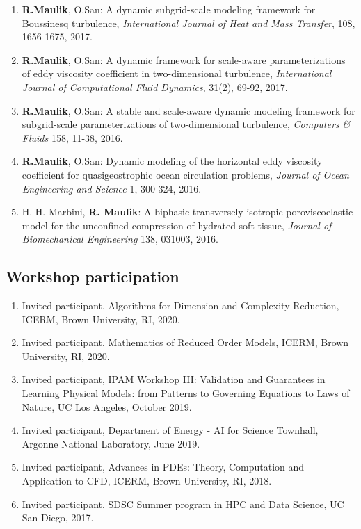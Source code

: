 \documentclass[letterpaper]{article}
\begin{document}
\begin{enumerate}
\item \textbf{R.Maulik}, O.San: A dynamic subgrid-scale modeling framework for Boussinesq turbulence, {\it International Journal of Heat and Mass Transfer}, 108, 1656-1675, 2017.

\item \textbf{R.Maulik}, O.San: A dynamic framework for scale-aware parameterizations of eddy viscosity coefficient in two-dimensional turbulence, {\it International Journal of Computational Fluid Dynamics}, 31(2), 69-92, 2017.

\item \textbf{R.Maulik}, O.San: A stable and scale-aware dynamic modeling framework for subgrid-scale parameterizations of two-dimensional turbulence, {\it Computers \& Fluids} 158, 11-38, 2016.

\item \textbf{R.Maulik}, O.San: Dynamic modeling of the horizontal eddy viscosity coefficient for quasigeostrophic ocean circulation problems, {\it Journal of Ocean Engineering and Science} 1, 300-324, 2016.

\item H. H. Marbini, \textbf{R. Maulik}: A biphasic transversely isotropic poroviscoelastic model for the unconfined compression of hydrated soft tissue, {\it Journal of Biomechanical Engineering} 138, 031003, 2016.

\end{enumerate}

\subsection*{Workshop participation}

\begin{enumerate}
	  \item Invited participant, Algorithms for Dimension and Complexity Reduction, ICERM, Brown University, RI, 2020.

    \item Invited participant, Mathematics of Reduced Order Models, ICERM, Brown University, RI, 2020.

    \item Invited participant, IPAM Workshop III: Validation and Guarantees in Learning Physical Models: from Patterns to Governing Equations to Laws of Nature, UC Los Angeles, October 2019.
    
    \item Invited participant, Department of Energy - AI for Science Townhall, Argonne National Laboratory, June 2019.
    
    \item Invited participant, Advances in PDEs: Theory, Computation and Application to CFD, ICERM, Brown University, RI, 2018.
    \item Invited participant, SDSC Summer program in HPC and Data Science, UC San Diego, 2017.
\end{enumerate}
\end{document}
